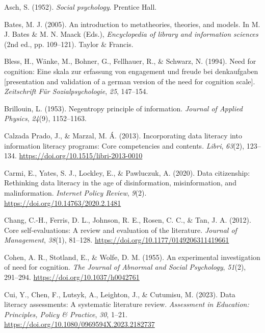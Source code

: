 \documentclass[
  12pt,
  a4paper,
  twoside]{article}
\newlength{\cslhangindent}
\newlength{\cslentryspacingunit} %
\newenvironment{CSLReferences}[2] %
 {%
  \setlength{\parindent}{0pt}
  \ifodd #1
  \let\oldpar\par
  \def\par{\hangindent=\cslhangindent\oldpar}
  \fi
  \setlength{\parskip}{#2\cslentryspacingunit}
 }%
 {}
\begin{document}
\hypertarget{refs}{}
\begin{CSLReferences}{1}{0}
\leavevmode{}%
Asch, S. (1952). \emph{Social psychology}. Prentice Hall.

\leavevmode{}%
Bates, M. J. (2005). An introduction to metatheories, theories, and models. In M. J. Bates \& M. N. Maack (Eds.), \emph{Encyclopedia of library and information sciences} (2nd ed., pp. 109--121). Taylor \& Francis.

\leavevmode{}%
Bless, H., Wänke, M., Bohner, G., Fellhauer, R., \& Schwarz, N. (1994). Need for cognition: Eine skala zur erfassung von engagement und freude bei denkaufgaben {[}presentation and validation of a german version of the need for cognition scale{]}. \emph{Zeitschrift Für Sozialpsychologie}, \emph{25}, 147--154.

\leavevmode{}%
Brillouin, L. (1953). Negentropy principle of information. \emph{Journal of Applied Physics}, \emph{24}(9), 1152--1163.

\leavevmode{}%
Calzada Prado, J., \& Marzal, M. Á. (2013). Incorporating data literacy into information literacy programs: Core competencies and contents. \emph{Libri}, \emph{63}(2), 123--134. \url{https://doi.org/10.1515/libri-2013-0010}

\leavevmode{}%
Carmi, E., Yates, S. J., Lockley, E., \& Pawluczuk, A. (2020). Data citizenship: Rethinking data literacy in the age of disinformation, misinformation, and malinformation. \emph{Internet Policy Review}, \emph{9}(2). \url{https://doi.org/10.14763/2020.2.1481}

\leavevmode{}%
Chang, C.-H., Ferris, D. L., Johnson, R. E., Rosen, C. C., \& Tan, J. A. (2012). Core self-evaluations: A review and evaluation of the literature. \emph{Journal of Management}, \emph{38}(1), 81--128. \url{https://doi.org/10.1177/0149206311419661}

\leavevmode{}%
Cohen, A. R., Stotland, E., \& Wolfe, D. M. (1955). An experimental investigation of need for cognition. \emph{The Journal of Abnormal and Social Psychology}, \emph{51}(2), 291--294. \url{https://doi.org/10.1037/h0042761}

\leavevmode{}%
Cui, Y., Chen, F., Lutsyk, A., Leighton, J., \& Cutumisu, M. (2023). Data literacy assessments: A systematic literature review. \emph{Assessment in Education: Principles, Policy \& Practice}, \emph{30}, 1--21. \url{https://doi.org/10.1080/0969594X.2023.2182737}


\end{CSLReferences}
\end{document}
